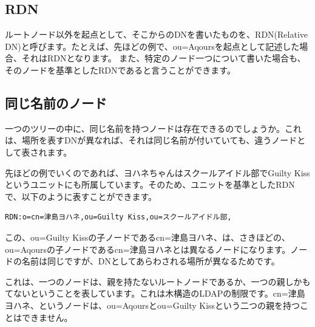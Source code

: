 \subsection{RDN}

ルートノード以外を起点として、そこからのDNを書いたものを、RDN(Relative DN)と呼びます。たとえば、先ほどの例で、ou=Aqoursを起点として記述した場合、それはRDNとなります。
また、特定のノード一つについて書いた場合も、そのノードを基準としたRDNであると言うことができます。

\subsection{同じ名前のノード}

一つのツリーの中に、同じ名前を持つノードは存在できるのでしょうか。これは、場所を表すDNが異なれば、それは同じ名前が付いていても、違うノードとして表されます。

先ほどの例でいくのであれば、ヨハネちゃんはスクールアイドル部でGuilty Kissというユニットにも所属しています。そのため、ユニットを基準としたRDNで、以下のように表すことができます。

\begin{verbatim}
RDN:o=cn=津島ヨハネ,ou=Guilty Kiss,ou=スクールアイドル部,
\end{verbatim}

この、ou=Guilty Kissの子ノードであるcn=津島ヨハネ、は、さきほどの、ou=Aqoursの子ノードであるcn=津島ヨハネとは異なるノードになります。ノードの名前は同じですが、DNとしてあらわされる場所が異なるためです。

これは、一つのノードは、親を持たないルートノードであるか、一つの親しかもてないということを表しています。これは木構造のLDAPの制限です。cn=津島ヨハネ、というノードは、ou=Aqoursとou=Guilty Kissという二つの親を持つことはできません。

